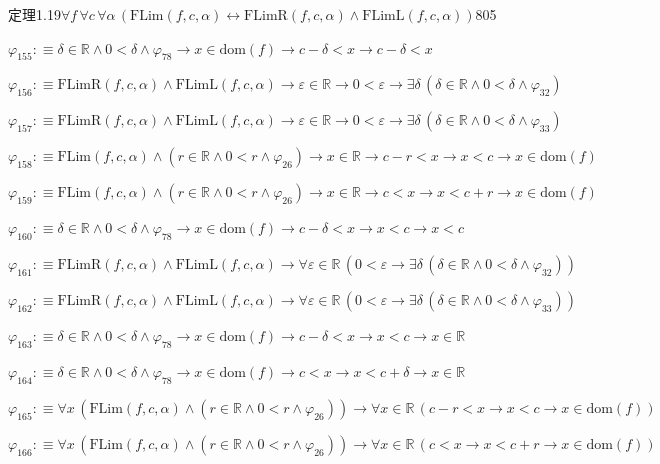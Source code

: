 \begin{fullproof}{定理1.19}{$\forall f\,\forall c\,\forall \alpha\,(\mathrm{FLim}(f,c,\alpha) \leftrightarrow \mathrm{FLimR}(f,c,\alpha) \land \mathrm{FLimL}(f,c,\alpha))$}{805}
\begin{abbrevlist}
\item $\varphi_{155} :\equiv \delta \in \mathbb{R} \land 0 < \delta \land \varphi_{78} \to x \in \mathrm{dom}(f) \to c - \delta < x \to c - \delta < x$
\item $\varphi_{156} :\equiv \mathrm{FLimR}(f,c,\alpha) \land \mathrm{FLimL}(f,c,\alpha) \to \varepsilon \in \mathbb{R} \to 0 < \varepsilon \to \exists \delta\,(\delta \in \mathbb{R} \land 0 < \delta \land \varphi_{32})$
\item $\varphi_{157} :\equiv \mathrm{FLimR}(f,c,\alpha) \land \mathrm{FLimL}(f,c,\alpha) \to \varepsilon \in \mathbb{R} \to 0 < \varepsilon \to \exists \delta\,(\delta \in \mathbb{R} \land 0 < \delta \land \varphi_{33})$
\item $\varphi_{158} :\equiv \mathrm{FLim}(f,c,\alpha) \land (r \in \mathbb{R} \land 0 < r \land \varphi_{26}) \to x \in \mathbb{R} \to c - r < x \to x < c \to x \in \mathrm{dom}(f)$
\item $\varphi_{159} :\equiv \mathrm{FLim}(f,c,\alpha) \land (r \in \mathbb{R} \land 0 < r \land \varphi_{26}) \to x \in \mathbb{R} \to c < x \to x < c + r \to x \in \mathrm{dom}(f)$
\item $\varphi_{160} :\equiv \delta \in \mathbb{R} \land 0 < \delta \land \varphi_{78} \to x \in \mathrm{dom}(f) \to c - \delta < x \to x < c \to x < c$
\item $\varphi_{161} :\equiv \mathrm{FLimR}(f,c,\alpha) \land \mathrm{FLimL}(f,c,\alpha) \to \forall \varepsilon \in \mathbb{R}\,(0 < \varepsilon \to \exists \delta\,(\delta \in \mathbb{R} \land 0 < \delta \land \varphi_{32}))$
\item $\varphi_{162} :\equiv \mathrm{FLimR}(f,c,\alpha) \land \mathrm{FLimL}(f,c,\alpha) \to \forall \varepsilon \in \mathbb{R}\,(0 < \varepsilon \to \exists \delta\,(\delta \in \mathbb{R} \land 0 < \delta \land \varphi_{33}))$
\item $\varphi_{163} :\equiv \delta \in \mathbb{R} \land 0 < \delta \land \varphi_{78} \to x \in \mathrm{dom}(f) \to c - \delta < x \to x < c \to x \in \mathbb{R}$
\item $\varphi_{164} :\equiv \delta \in \mathbb{R} \land 0 < \delta \land \varphi_{78} \to x \in \mathrm{dom}(f) \to c < x \to x < c + \delta \to x \in \mathbb{R}$
\item $\varphi_{165} :\equiv \forall x\,(\mathrm{FLim}(f,c,\alpha) \land (r \in \mathbb{R} \land 0 < r \land \varphi_{26})) \to \forall x \in \mathbb{R}\,(c - r < x \to x < c \to x \in \mathrm{dom}(f))$
\item $\varphi_{166} :\equiv \forall x\,(\mathrm{FLim}(f,c,\alpha) \land (r \in \mathbb{R} \land 0 < r \land \varphi_{26})) \to \forall x \in \mathbb{R}\,(c < x \to x < c + r \to x \in \mathrm{dom}(f))$

\end{abbrevlist}
\end{fullproof}
